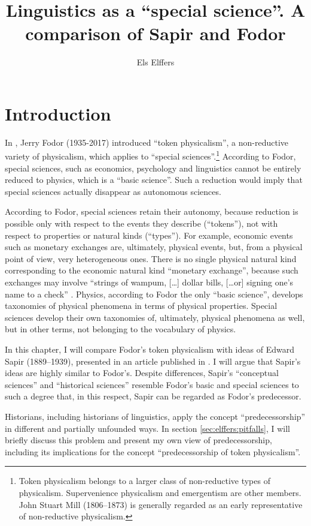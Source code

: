 \documentclass[output=paper]{langscibook}
\author{Els Elffers}
\title{Linguistics as a ``special science''. A comparison of Sapir and Fodor}
\begin{document}
\maketitle

\section{Introduction} 
\label{sec:elffers:intro}
In \citeyear{Fodor1974}, Jerry Fodor (1935-2017) introduced ``token physicalism'', a non-reductive variety of physicalism, which applies to ``special sciences''.\footnote{Token physicalism belongs to a larger class of non-reductive types of physicalism. Supervenience physicalism and emergentism are other members. John Stuart Mill (1806–1873) is generally regarded as an early representative of non-reductive physicalism.} According to Fodor, special sciences, such as economics, psychology and linguistics cannot be entirely reduced to physics, which is a ``basic science''. Such a reduction would imply that special sciences actually disappear as autonomous sciences. 

According to Fodor, special sciences retain their autonomy, because reduction is possible only with respect to the events they describe (``tokens''), not with respect to properties or natural kinds (``types''). For example, economic events such as monetary exchanges are, ultimately, physical events, but, from a physical point of view, very heterogeneous ones. There is no single physical natural kind corresponding to the economic natural kind ``monetary exchange'', because such exchanges may involve ``strings of wampum, […] dollar bills, […or] signing one's name to a check'' \citep[103]{Fodor1974}. Physics, according to Fodor the only ``basic science'', develops taxonomies of physical phenomena in terms of physical properties. Special sciences develop their own taxonomies of, ultimately, physical phenomena as well, but in other terms, not belonging to the vocabulary of physics.

In this chapter, I will compare Fodor's token physicalism with ideas of Edward Sapir (1889–1939), presented in an article published in \citeyear{Sapir1917}. I will argue that Sapir's ideas are highly similar to Fodor's. Despite differences, Sapir's ``conceptual sciences'' and ``historical sciences'' resemble Fodor's basic and special sciences to such a degree that, in this respect, Sapir can be regarded as Fodor's predecessor.\label{q:elffers:probsols}

Historians, including historians of linguistics, apply the concept ``predecessorship'' in different and partially unfounded ways. In section \ref{sec:elffers:pitfalls}, I will briefly discuss this problem and present my own view of predecessorship, including its implications for the concept ``predecessorship of token physicalism''.
\end{document}
